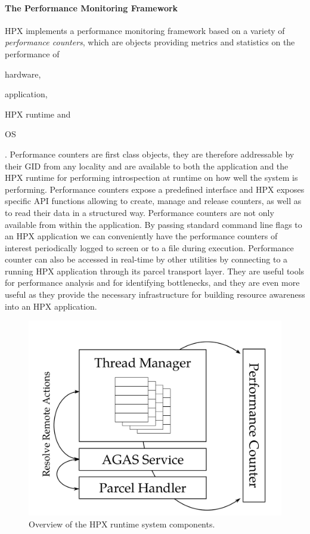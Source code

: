 \paragraph{The Performance Monitoring Framework}
\enlargethispage{-1\baselineskip} %
HPX implements a performance monitoring framework based on a variety of \emph{performance counters}, which are objects providing metrics and statistics on the performance of
\begin{enumerate*}[label={(\roman*)}]
	\item hardware,
	\item application,
	\item HPX runtime and
	\item OS
\end{enumerate*}.
Performance counters are first class objects, they are therefore addressable by their GID from any locality and are available to both the application and the HPX runtime for performing introspection at runtime on how well the system is performing.\cite{kaiser2014hpx}
Performance counters expose a predefined interface and HPX exposes specific API functions allowing to create, manage and release counters, as well as to read their data in a structured way.
Performance counters are not only available from within the application. By passing standard command line flags to an HPX application we can conveniently have the performance counters of interest periodically logged to screen or to a file during execution. Performance counter can also be accessed in real-time by other utilities by connecting to a running HPX application through its parcel transport layer\cite{kaiser2014hpx}.
They are useful tools for performance analysis and for identifying bottlenecks, and they are even more useful as they provide the necessary infrastructure for building resource awareness into an HPX application\cite{grubel2016using}.

\begin{figure}[t]
 	\begin{center}
 		\includegraphics[scale=0.18]{Figures/hpxArchitecture.png}
 		\caption{Overview of the HPX runtime system components\protect\cite{heller2017hpx}.}
 		\label{fig:hpxArchitecture}
 	\end{center}
\end{figure}


